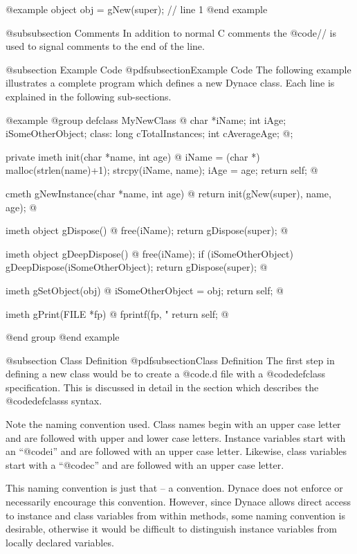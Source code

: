 @example
        object  obj = gNew(super);  // line 1
@end example


@subsubsection Comments
In addition to normal C comments the @code{//} is used to signal comments
to the end of the line.


@subsection Example Code
@pdfsubsection{Example Code}
The following example illustrates a complete program which defines a new
Dynace class.  Each line is explained in the following sub-sections.

@example
@group
defclass  MyNewClass  @{
        char    *iName;
        int     iAge;
        iSomeOtherObject;
 class:
        long    cTotalInstances;
        int     cAverageAge;
@};

private imeth init(char *name, int age)
@{
        iName = (char *) malloc(strlen(name)+1);
        strcpy(iName, name);
        iAge = age;
        return self;
@}

cmeth  gNewInstance(char *name, int age)
@{
        return init(gNew(super), name, age);
@}

imeth   object    gDispose()
@{
        free(iName);
        return gDispose(super);
@}

imeth   object   gDeepDispose()
@{
        free(iName);
        if (iSomeOtherObject)
                gDeepDispose(iSomeOtherObject);
        return gDispose(super);
@}

imeth   gSetObject(obj)
@{
        iSomeOtherObject = obj;
        return self;
@}

imeth   gPrint(FILE *fp)
@{
        fprintf(fp, "%
        return self;
@}

@end group
@end example


@subsection Class Definition
@pdfsubsection{Class Definition}
The first step in defining a new class would be to create a @code{.d}
file with a @code{defclass} specification.  This is discussed in
detail in the section which describes the @code{defclasss} syntax.

Note the naming convention used.  Class names begin with an upper case
letter and are followed with upper and lower case letters.  Instance
variables start with an ``@code{i}'' and are followed with an upper case
letter.  Likewise, class variables start with a ``@code{c}'' and are
followed with an upper case letter.

This naming convention is just that -- a convention.  Dynace does
not enforce or necessarily encourage this convention.  However,
since Dynace allows direct access to instance and class variables
from within methods, some naming convention is desirable, otherwise
it would be difficult to distinguish instance variables from locally
declared variables.

